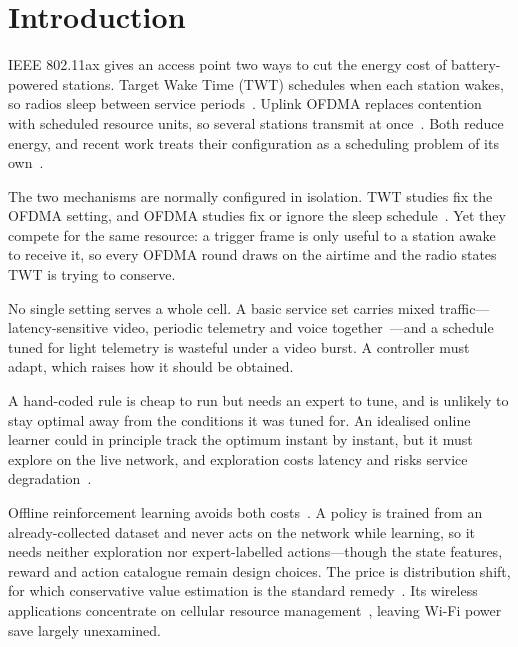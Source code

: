 \section{Introduction}

IEEE 802.11ax gives an access point two ways to cut the energy cost of
battery-powered stations. Target Wake Time (TWT) schedules when each station
wakes, so radios sleep between service
periods~\cite{chen2019twt,qiu2021category}. Uplink OFDMA replaces contention
with scheduled resource units, so several stations transmit at
once~\cite{kotagiri2021distributed,han2024multiagent}. Both reduce energy, and
recent work treats their configuration as a scheduling problem of its
own~\cite{busacca2026twt,liu2025priority}.

The two mechanisms are normally configured in isolation. TWT studies fix the
OFDMA setting, and OFDMA studies fix or ignore the sleep
schedule~\cite{karaca2020joint,noh2024joint}. Yet they compete for the same
resource: a trigger frame is only useful to a station awake to receive it, so
every OFDMA round draws on the airtime and the radio states TWT is trying to
conserve.

No single setting serves a whole cell. A basic service set carries mixed
traffic---latency-sensitive video, periodic telemetry and voice
together~\cite{yang2021twt,tan2024drl}---and a schedule tuned for light
telemetry is wasteful under a video burst. A controller must adapt, which
raises how it should be obtained.

A hand-coded rule is cheap to run but needs an expert to tune, and is unlikely
to stay optimal away from the conditions it was tuned for. An idealised online
learner could in principle track the optimum instant by instant, but it must
explore on the live network, and exploration costs latency and risks service
degradation~\cite{wydmanski2021contention,yang2024offline}.

Offline reinforcement learning avoids both
costs~\cite{levine2020offline}. A policy is trained from an already-collected
dataset and never acts on the network while learning, so it needs neither
exploration nor expert-labelled actions---though the state features, reward and
action catalogue remain design choices. The price is
distribution shift, for which conservative value estimation is the standard
remedy~\cite{kumar2020cql,kostrikov2022iql}. Its wireless applications
concentrate on cellular resource
management~\cite{yang2024offline,eldeeb2026marl}, leaving Wi-Fi power save
largely unexamined.

